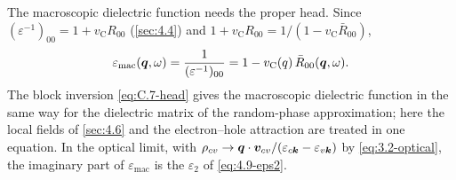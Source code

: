 The macroscopic dielectric function needs the proper head. Since $(\varepsilon^{-1})_{00} = 1 + v_{\mathrm{C}}R_{00}$ (\cref{sec:4.4}) and $1 + v_{\mathrm{C}}R_{00} = 1/(1 - v_{\mathrm{C}}\bar R_{00})$,
\begin{equation}
  \varepsilon_{\mathrm{mac}}(\bm{q},\omega) = \frac{1}{(\varepsilon^{-1})_{00}} = 1 - v_{\mathrm{C}}(q)\,\bar R_{00}(\bm{q},\omega) .
  \label{eq:D.12-epsmac}
\end{equation}
The block inversion \cref{eq:C.7-head} gives the macroscopic dielectric function in the same way for the dielectric matrix of the random-phase approximation; here the local fields of \cref{sec:4.6} and the electron--hole attraction are treated in one equation. In the optical limit, with $\rho_{cv} \to \bm{q}\cdot\bm{v}_{cv}/(\varepsilon_{c\bm{k}} - \varepsilon_{v\bm{k}})$ by \cref{eq:3.2-optical}, the imaginary part of $\varepsilon_{\mathrm{mac}}$ is the $\varepsilon_2$ of \cref{eq:4.9-eps2}.
